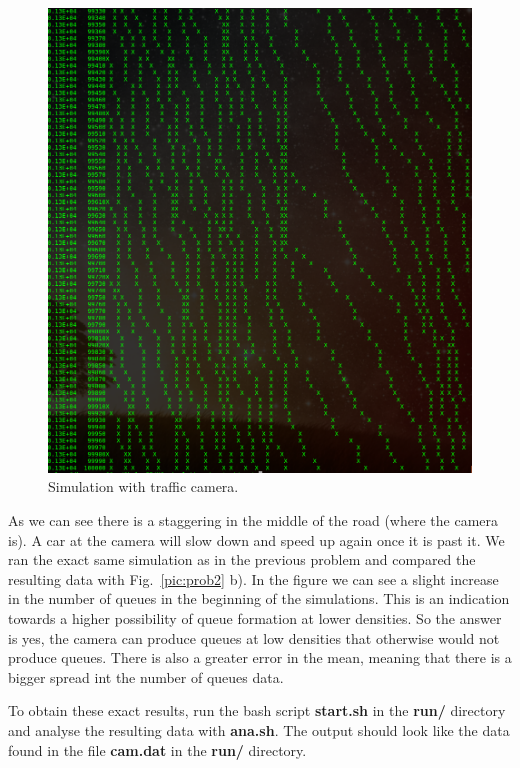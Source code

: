 \documentclass[a4paper,12pt]{article}
\begin{document}
\begin{enumerate}
\begin{figure}[h]
\centering
\includegraphics[width=\columnwidth]{trafcam.png}
\caption{Simulation with traffic camera.}
\label{pic:cam}
\end{figure}

As we can see there is a staggering in the middle of the road (where the camera is). A car at the camera will slow down and speed up again once it is past it. We ran the exact same simulation as in the previous problem and compared the resulting data with Fig.~\ref{pic:prob2} b). In the figure we can see a slight increase in the number of queues in the beginning of the simulations. This is an indication towards a higher possibility of queue formation at lower densities. So the answer is yes, the camera can produce queues at low densities that otherwise would not produce queues. There is also a greater error in the mean, meaning that there is a bigger spread int the number of queues data. 

To obtain these exact results, run the bash script {\bf{start.sh}} in the {\bf{run/}} directory and analyse the resulting data with {\bf{ana.sh}}. The output should look like the data found in the file {\bf{cam.dat}} in the {\bf{run/}} directory.


\end{enumerate}
\end{document}
